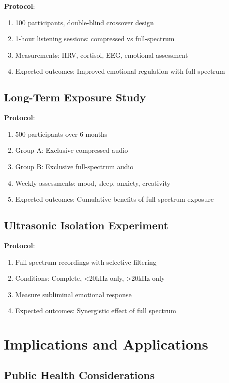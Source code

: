 \documentclass[12pt,a4paper]{article}
\begin{document}
\textbf{Protocol}:
\begin{enumerate}
\item 100 participants, double-blind crossover design
\item 1-hour listening sessions: compressed vs full-spectrum
\item Measurements: HRV, cortisol, EEG, emotional assessment
\item Expected outcomes: Improved emotional regulation with full-spectrum
\end{enumerate}

\subsection{Long-Term Exposure Study}

\textbf{Protocol}:
\begin{enumerate}
\item 500 participants over 6 months
\item Group A: Exclusive compressed audio
\item Group B: Exclusive full-spectrum audio
\item Weekly assessments: mood, sleep, anxiety, creativity
\item Expected outcomes: Cumulative benefits of full-spectrum exposure
\end{enumerate}

\subsection{Ultrasonic Isolation Experiment}

\textbf{Protocol}:
\begin{enumerate}
\item Full-spectrum recordings with selective filtering
\item Conditions: Complete, <20kHz only, >20kHz only
\item Measure subliminal emotional response
\item Expected outcomes: Synergistic effect of full spectrum
\end{enumerate}

\section{Implications and Applications}

\subsection{Public Health Considerations}
\end{document}
